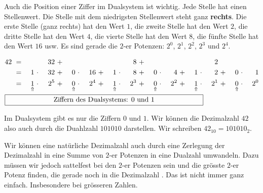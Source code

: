 Auch die Position einer Ziffer im Dualsystem ist wichtig. Jede Stelle hat einen Stellenwert. Die Stelle mit dem niedrigsten Stellenwert steht ganz \textbf{rechts}. Die erste Stelle (ganz rechts) hat den Wert $1$, die zweite Stelle hat den Wert $2$, die dritte Stelle hat den Wert $4$, die vierte Stelle hat den Wert $8$, die fünfte Stelle hat den Wert $16$ usw. Es sind gerade die $2$-er Potenzen: $2^0$, $2^1$, $2^2$, $2^3$ und $2^4$.

\begin{example}

\begin{alignat*}{16}
42 & ~ = ~ & & & 32 & ~ + ~ & & & & & & & 8 & ~ + ~ & & & & & & & 2 &\\
& ~ = ~ & 1 & ~\cdot~ & 32 & ~ + ~ & 0 & ~\cdot~ & 16 & ~ + ~ & 1 & ~\cdot~ & 8 & ~ + ~ & 0 & ~\cdot~ & 4 & ~ + ~ & 1 & ~\cdot~ & 2 & ~ + ~ & 0 & ~\cdot~ & 1 \\
& ~ = ~ & \underset{\Uparrow}{1} & ~\cdot~ & 2^5  & ~ + ~ & \underset{\Uparrow}{0} & ~\cdot~ & 2^4  & ~ + ~ & \underset{\Uparrow}{1} & ~\cdot~ & 2^3 & ~ + ~ & \underset{\Uparrow}{0} & ~\cdot~ & 2^2 & ~ + ~ & \underset{\Uparrow}{1} & ~\cdot~ & 2^1 & ~ + ~ & \underset{\Uparrow}{0} & ~\cdot~ & 2^0 \\
\omit\rlap{\framebox[10cm]{Ziffern des Dualsystems: $0$ und $1$}}
\end{alignat*}

Im Dualsystem gibt es nur die Ziffern $0$ und $1$. Wir können die Dezimalzahl $42$ also auch durch die Duahlzahl $101010$ darstellen. Wir schreiben $42_{10} = 101010_2$.

\end{example}

Wir können eine natürliche Dezimalzahl auch durch eine Zerlegung der Dezimalzahl in eine Summe von $2$-er Potenzen in eine Dualzahl umwandeln. Dazu müssen wir jedoch sattelfest bei den $2$-er Potenzen sein und die grösste $2$-er Potenz finden, die gerade noch in die Dezimalzahl . Das ist nicht immer ganz einfach. Insbesondere bei grösseren Zahlen.

